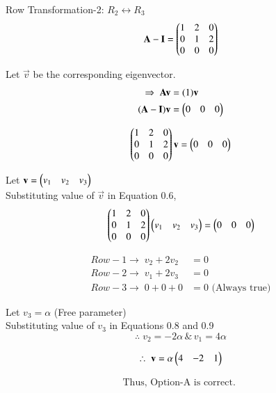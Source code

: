 \documentclass[journal]{IEEEtran}
\begin{document}
Row Transformation-2: $R_2 \leftrightarrow R_3$
\begin{equation}
   \mathbf{A} - \mathbf{I} = \begin{pmatrix}1 & 2 & 0 \\ 0 & 1 & 2 \\ 0 & 0 & 0\end{pmatrix}
\end{equation}


Let $\vec{v}$ be the corresponding eigenvector.
\begin{align}
    \Rightarrow \; \mathbf{A}\mathbf{v} &= (1)\mathbf{v} \\ 
    (\mathbf{A} - \mathbf{I})\mathbf{v} &= \begin{pmatrix}0 & 0 & 0\end{pmatrix}
\end{align}

\begin{equation}
\begin{pmatrix}1 & 2 & 0 \\ 0 & 1 & 2 \\ 0 & 0 & 0\end{pmatrix}\mathbf{v} = \begin{pmatrix}0 & 0 & 0\end{pmatrix}    
\end{equation}

\newpage

Let $\mathbf{v} = \begin{pmatrix}v_1 & v_2 & v_3\end{pmatrix}$\\

Substituting value of $\vec{v}$ in Equation 0.6,
\begin{equation}
   \begin{pmatrix}1 & 2 & 0 \\ 0 & 1 & 2 \\ 0 & 0 & 0\end{pmatrix}\begin{pmatrix}v_1 & v_2 & v_3\end{pmatrix} = \begin{pmatrix}0 & 0 & 0\end{pmatrix} 
\end{equation}

\begin{align}
    Row-1 \rightarrow \; v_2 + 2v_2 &= 0\\
    Row-2 \rightarrow \; v_1 + 2v_3 &= 0\\
    Row-3 \rightarrow \; 0 + 0 + 0 &= 0 \text{ (Always true)}
\end{align}

Let $v_3 = \alpha$ (Free parameter)\\
Substituting value of $v_3$ in Equations 0.8 and 0.9
\begin{equation}
\therefore \; v_2 = -2\alpha \, \&  \, v_1 = 4\alpha  
\end{equation}

\begin{equation}
    \therefore \; \mathbf{v} = \alpha \begin{pmatrix}4 & -2 & 1\end{pmatrix} 
\end{equation}

\begin{align*}
    \boxed{\text{Thus, Option-A is correct. }}
\end{align*}
\end{document}
